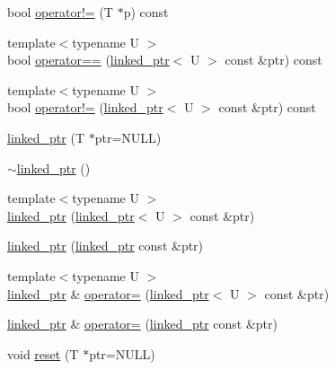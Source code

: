 \begin{DoxyCompactItemize}
\item 
bool \hyperlink{classtesting_1_1internal_1_1linked__ptr_ab14a2062bd0b5bb60371ca1dace31121}{operator!=} (\-T $\ast$p) const 
\item 
{\footnotesize template$<$typename U $>$ }\\bool \hyperlink{classtesting_1_1internal_1_1linked__ptr_a0713d3f03d2eb42910cf283b7cbb4990}{operator==} (\hyperlink{classtesting_1_1internal_1_1linked__ptr}{linked\-\_\-ptr}$<$ \-U $>$ const \&ptr) const 
\item 
{\footnotesize template$<$typename U $>$ }\\bool \hyperlink{classtesting_1_1internal_1_1linked__ptr_aed905b6347c4e4d62e5a80d4405febf2}{operator!=} (\hyperlink{classtesting_1_1internal_1_1linked__ptr}{linked\-\_\-ptr}$<$ \-U $>$ const \&ptr) const 
\item 
\hyperlink{classtesting_1_1internal_1_1linked__ptr_ad3af47385eb0bf584149494be2a97119}{linked\-\_\-ptr} (\-T $\ast$ptr=\-N\-U\-L\-L)
\item 
\hyperlink{classtesting_1_1internal_1_1linked__ptr_a799b9ee3a6c25b39be3c1cfbb0587f1b}{$\sim$linked\-\_\-ptr} ()
\item 
{\footnotesize template$<$typename U $>$ }\\\hyperlink{classtesting_1_1internal_1_1linked__ptr_a5693f10a8e25d5dfb1d8b252c05cfdcf}{linked\-\_\-ptr} (\hyperlink{classtesting_1_1internal_1_1linked__ptr}{linked\-\_\-ptr}$<$ \-U $>$ const \&ptr)
\item 
\hyperlink{classtesting_1_1internal_1_1linked__ptr_a36cdf4fac0a11b31aad04af9c848b9ac}{linked\-\_\-ptr} (\hyperlink{classtesting_1_1internal_1_1linked__ptr}{linked\-\_\-ptr} const \&ptr)
\item 
{\footnotesize template$<$typename U $>$ }\\\hyperlink{classtesting_1_1internal_1_1linked__ptr}{linked\-\_\-ptr} \& \hyperlink{classtesting_1_1internal_1_1linked__ptr_ae23811858c9bbe46657e58833df0d4bb}{operator=} (\hyperlink{classtesting_1_1internal_1_1linked__ptr}{linked\-\_\-ptr}$<$ \-U $>$ const \&ptr)
\item 
\hyperlink{classtesting_1_1internal_1_1linked__ptr}{linked\-\_\-ptr} \& \hyperlink{classtesting_1_1internal_1_1linked__ptr_a38e7580dc22157a3d7197f612c16a295}{operator=} (\hyperlink{classtesting_1_1internal_1_1linked__ptr}{linked\-\_\-ptr} const \&ptr)
\item 
void \hyperlink{classtesting_1_1internal_1_1linked__ptr_a99b45e8256f15599d6af110535e93a44}{reset} (\-T $\ast$ptr=\-N\-U\-L\-L)

\end{DoxyCompactItemize}
